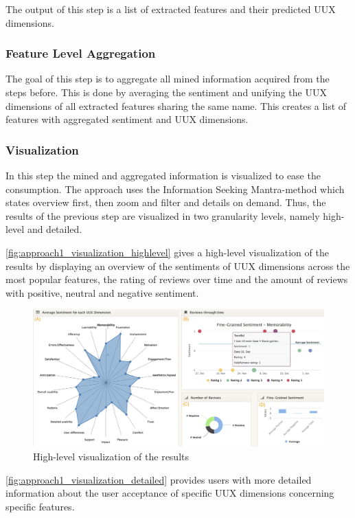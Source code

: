 The output of this step is a list of extracted features and their predicted UUX dimensions.

\subsubsection*{Feature Level Aggregation}
The goal of this step is to aggregate all mined information acquired from the steps before. This is done by averaging the sentiment and unifying the UUX dimensions of all extracted features sharing the same name. This creates a list of features with aggregated sentiment and UUX dimensions.

\subsubsection*{Visualization}
In this step the mined and aggregated information is visualized to ease the consumption. The approach uses the Information Seeking Mantra-method \cite{Shneiderman1996} which states overview first, then zoom and filter and details on demand. Thus, the results of the previous step are visualized in two granularity levels, namely high-level and detailed.

\autoref{fig:approach1_visualization_highlevel} gives a high-level visualization of the results by displaying an overview of the sentiments of UUX dimensions across the most popular features, the rating of reviews over time and the amount of reviews with positive, neutral and negative sentiment.

\begin{figure}
    \centering
    \includegraphics[width=\textwidth]{images/Thema4_Approach1_Visualization_HighLevel.png}
    \caption{High-level visualization of the results \cite[Figure 2]{Bakiu2017}}
    \label{fig:approach1_visualization_highlevel}
\end{figure}

\autoref{fig:approach1_visualization_detailed} provides users with more detailed information about the user acceptance of specific UUX dimensions concerning specific features.


